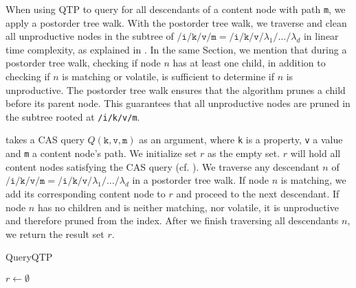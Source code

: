 \documentclass[abstracton,12pt]{scrartcl}
\theoremstyle{definition}
\begin{document}
When using QTP to query for all descendants of a content node with path \texttt{m},
we apply a postorder tree walk.
With the postorder tree walk, we traverse and clean all unproductive nodes in
the subtree of $\texttt{/i/k/v/m} =
\texttt{/i/k/v/} \lambda_1 \texttt{/} \dots \texttt{/} \lambda_d$ in linear time
complexity, as explained in . In the same Section, we mention that
during a postorder tree walk,
checking if node $n$ has at least one child, in addition to checking if $n$ is
matching or volatile, is sufficient to determine if $n$ is unproductive.
The postorder tree walk ensures that the algorithm prunes
a child before its parent node. This guarantees that all unproductive nodes are
pruned in the subtree rooted at \texttt{/i/k/v/m}.

 takes a CAS query
$Q(\texttt{k},\texttt{v},\texttt{m})$ as an argument, where
\texttt{k} is a property, \texttt{v} a value and \texttt{m} a content node's
path. We initialize set $r$
as the empty set. $r$ will hold all content nodes satisfying the CAS query (cf.
).
We traverse any descendant $n$ of $\texttt{/i/k/v/m} =
\texttt{/i/k/v/}\lambda_1\texttt{/}\dots\texttt{/}\lambda_d$ in a postorder tree
walk. If node $n$ is matching, we add its corresponding content node to
$r$ and proceed to the next descendant. If node $n$ has no children and is
neither matching, nor volatile, it is unproductive and therefore pruned from the index.
After we finish traversing all descendants $n$, we return the result set $r$.

\begin{algorithm}
  \caption{QueryQTP}
  \DontPrintSemicolon
  $r \longleftarrow \emptyset$\;
  \;
  \label{algo:query_qtp_wapi}
\end{algorithm}
\end{document}
